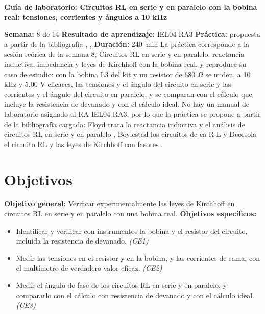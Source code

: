 \documentclass[12pt]{article}
\begin{document}
\nocite{ref1,ref2,ref3}

\datosguia
\lineablanco

{\centering\bfseries Guía de laboratorio: Circuitos RL en serie y en paralelo con la bobina real: tensiones, corrientes y ángulos a 10 kHz\par}
\lineablanco
\textbf{Semana:} 8 de 14 \quad \textbf{Resultado de aprendizaje:} IEL04-RA3 \quad \textbf{Práctica:} propuesta a partir de la bibliografía \cite{ref1}, \cite{ref2}, \cite{ref3} \quad \textbf{Duración:} \SI{240}{\minute}
\lineablanco
La práctica corresponde a la sesión teórica de la semana 8, \guillemotleft{}Circuitos RL en serie y en paralelo: reactancia inductiva, impedancia y leyes de Kirchhoff con la bobina real\guillemotright{}, y reproduce su caso de estudio: con la bobina L3 del kit y un resistor de 680 \ensuremath{\Omega} se miden, a 10 kHz y 5,00 V eficaces, las tensiones y el ángulo del circuito en serie y las corrientes y el ángulo del circuito en paralelo, y se comparan con el cálculo que incluye la resistencia de devanado y con el cálculo ideal. No hay un manual de laboratorio asignado al RA IEL04-RA3, por lo que la práctica se propone a partir de la bibliografía cargada: Floyd trata la reactancia inductiva y el análisis de circuitos RL en serie y en paralelo \cite{ref1}, Boylestad los circuitos de ca R-L \cite{ref2} y Deorsola el circuito RL y las leyes de Kirchhoff con fasores \cite{ref3}.

\section{Objetivos}\label{sec:objetivos}
\textbf{Objetivo general:} Verificar experimentalmente las leyes de Kirchhoff en circuitos RL en serie y en paralelo con una bobina real.
\lineablanco
\textbf{Objetivos específicos:}
\begin{itemize}
  \item Identificar y verificar con instrumentos la bobina y el resistor del circuito, incluida la resistencia de devanado. \emph{(CE1)}
  \item Medir las tensiones en el resistor y en la bobina, y las corrientes de rama, con el multímetro de verdadero valor eficaz. \emph{(CE2)}
  \item Medir el ángulo de fase de los circuitos RL en serie y en paralelo, y compararlo con el cálculo con resistencia de devanado y con el cálculo ideal. \emph{(CE3)}
\end{itemize}
\end{document}
